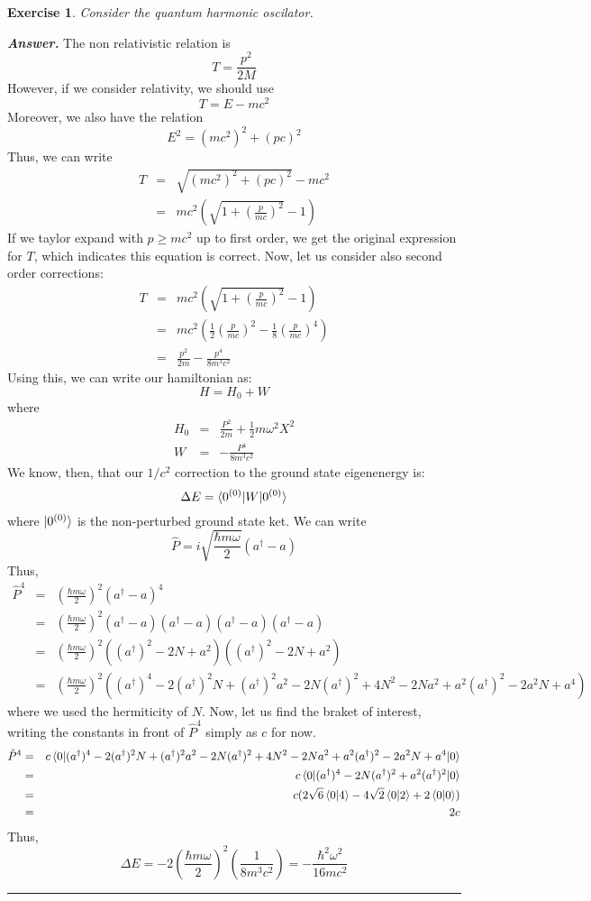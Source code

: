 \documentclass[12pt]{article}
\def\be{\begin{equation}}
\def\ee{\end{equation}}
\def\bea{\begin{eqnarray*}}
\def\eea{\end{eqnarray*}}
\def\f{\frac}
\def\l{\left}
\def\r{\right}
\newtheorem{exercise}{Exercise}
\newenvironment{answer}{\noindent\textbf{\textit{Answer.}} \normalfont }{\par\noindent\rule{\textwidth}{0.4pt}}
\begin{document}
	\begin{exercise}
		Consider the quantum harmonic oscilator. 
	\end{exercise}
	\begin{answer}
		The non relativistic relation is
		\be
			T = \f{p^2}{2M}
		\ee
		However, if we consider relativity, we should use
		\be
			T = E - mc^2
		\ee
		Moreover, we also have the relation
		\be
			E^2 = (mc^2)^2 + (pc)^2
		\ee
		Thus, we can write
		\bea
			T &=& \sqrt{(mc^2)^2 + (pc)^2} - mc^2 \\
			&=& mc^2\l( \sqrt{1 + \l(\f{p}{mc}\r)^2} - 1 \r)
		\eea
		If we taylor expand with $p\geq mc^2$ up to first order, we get the original expression for $T$, which indicates this equation is correct. Now, let us consider also second order corrections:
		\bea
			T &=& mc^2\l( \sqrt{1 + \l(\f{p}{mc}\r)^2} - 1 \r) \\
				&=& mc^2 \l( \f{1}{2}\l(\f{p}{mc}\r)^2 - \f{1}{8}\l(\f{p}{mc}\r)^4 \r) \\
				&=& \f{p^2}{2m} - \f{p^4}{8m^3c^2}
		\eea
		Using this, we can write our hamiltonian as:
		\be
			H = H_0 + W
		\ee
		where 
		\bea
			H_0 &=& \f{P^2}{2m} + \f{1}{2}m\omega^2 X^2 \\
			W &=& -\f{P^4}{8m^3c^2}
		\eea
		We know, then, that our $1/c^2$ correction to the ground state eigenenergy is:
		\be
			\Delta E = \braket{0^{(0)} | W | 0^{(0)} }
		\ee
		where $\ket{0^{(0)}}$ is the non-perturbed ground state ket. We can write
		\be
			\hat{P} = i\sqrt{\f{\hbar m \omega}{2}}(a^\dagger - a)
		\ee
		Thus,
		\bea
			\hat{P}^4 &=& \l( \f{\hbar m\omega}{2} \r)^2 (a^\dagger-a)^4 \\
				&=& \l( \f{\hbar m\omega}{2} \r)^2 (a^\dagger-a)(a^\dagger-a)(a^\dagger-a)(a^\dagger-a) \\
				&=& \l( \f{\hbar m\omega}{2} \r)^2 ((a^\dagger)^2 - 2N +a^2)((a^\dagger)^2 - 2N +a^2) \\
				&=& \l( \f{\hbar m\omega}{2} \r)^2 ( (a^\dagger)^4 -2(a^\dagger)^2N + (a^\dagger)^2a^2 - 2N(a^\dagger)^2 + 4N^2 -2Na^2 + a^2(a^\dagger)^2 -2a^2N + a^4 ) 
		\eea
		where we used the hermiticity of $N$. Now, let us find the braket of interest, writing the constants in front of $\hat{P}^4$ simply as $c$ for now. 
		\bea
			\hat{P}^4 &=& c \braket{0 | (a^\dagger)^4 -2(a^\dagger)^2N + (a^\dagger)^2a^2 - 2N(a^\dagger)^2 + 4N^2 -2Na^2 + a^2(a^\dagger)^2 -2a^2N + a^4 | 0} \\
				&=& c\braket{0 | (a^\dagger)^4 - 2N(a^\dagger)^2 + a^2(a^\dagger)^2 | 0} \\
				&=& c( 2\sqrt{6}\braket{0 | 4} -4\sqrt{2}\braket{0 | 2} + 2\braket{0 | 0} ) \\
				&=& 2c
		\eea
		Thus,
		\be
			\Delta E = -2\l( \f{\hbar m \omega}{2} \r)^2 \l( \f{1}{8m^3c^2} \r) = -\f{\hbar^2\omega^2}{16 m c^2}
		\ee
	\end{answer}
	
\end{document}

